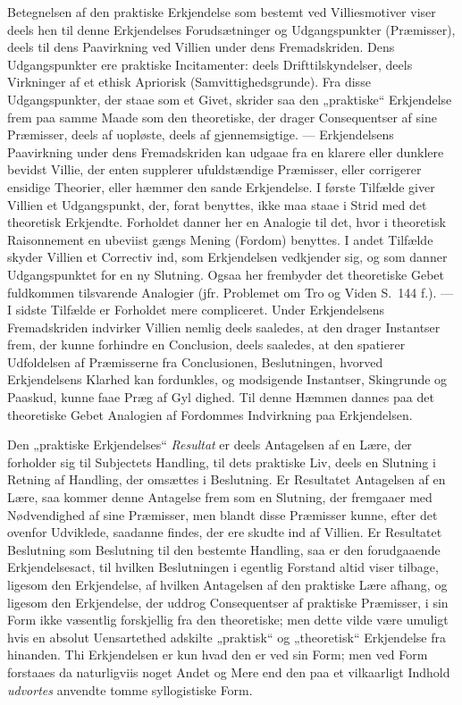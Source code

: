 Betegnelsen af den praktiske Erkjendelse som bestemt ved Villiesmotiver viser
deels hen til denne Erkjendelses Forudsætninger og Udgangspunkter
(Præmisser), deels til dens Paavirkning ved Villien under dens Fremadskriden.
Dens Udgangspunkter ere praktiske Incitamenter: deels Drifttilskyndelser,
deels Virkninger af et ethisk Apriorisk (Samvittighedsgrunde). Fra disse
Udgangspunkter, der staae som et Givet, skrider saa den „praktiske“
Erkjendelse frem paa samme Maade som den theoretiske, der drager Consequentser
af sine Præmisser, deels af uopløste, deels af gjennemsigtige. ---
Erkjendelsens Paavirkning under dens Fremadskriden kan udgaae fra en klarere
eller dunklere bevidst Villie, der enten supplerer ufuldstændige Præmisser,
eller corrigerer ensidige Theorier, eller hæmmer den sande Erkjendelse. I
første Tilfælde giver Villien et Udgangspunkt, der, forat benyttes, ikke maa
staae i Strid med det theoretisk Erkjendte. Forholdet danner her en Analogie
til det, hvor i theoretisk Raisonnement en ubeviist gængs Mening (Fordom)
benyttes. I andet Tilfælde skyder Villien et Correctiv ind, som Erkjendelsen
vedkjender sig, og som danner Udgangspunktet for en ny Slutning. Ogsaa her
frembyder det theoretiske Gebet fuldkommen tilsvarende Analogier (jfr.
Problemet om Tro og Viden S.\ 144 f.). --- I sidste Tilfælde er Forholdet mere
compliceret. Under Erkjendelsens Fremadskriden indvirker Villien nemlig deels
saaledes, at den drager Instantser frem, der kunne forhindre en Conclusion,
deels saaledes, at den spatierer Udfoldelsen af Præmisserne fra Conclusionen,
Beslutningen, hvorved Erkjendelsens Klarhed kan fordunkles, og modsigende
Instantser, Skingrunde og Paaskud, kunne faae Præg af Gyl\-%
dighed. Til denne Hæmmen dannes paa det theoretiske Gebet Analogien af
Fordommes Indvirkning paa Erkjendelsen.

Den „praktiske Erkjendelses“ \emph{Resultat} er deels Antagelsen af en Lære,
der forholder sig til Subjectets Handling, til dets praktiske Liv, deels en
Slutning i Retning af Handling, der omsættes i Beslutning. Er Resultatet
Antagelsen af en Lære, saa kommer denne Antagelse frem som en Slutning, der
fremgaaer med Nødvendighed af sine Præmisser, men blandt disse Præmisser
kunne, efter det ovenfor Udviklede, saadanne findes, der ere skudte ind af
Villien. Er Resultatet Beslutning som Beslutning til den bestemte Handling,
saa er den forudgaaende Erkjendelsesact, til hvilken Beslutningen i egentlig
Forstand altid viser tilbage, ligesom den Erkjendelse, af hvilken Antagelsen
af den praktiske Lære afhang, og ligesom den Erkjendelse, der uddrog
Consequentser af praktiske Præmisser, i sin Form ikke væsentlig forskjellig
fra den theoretiske; men dette vilde være umuligt hvis en absolut
Uensartethed adskilte „praktisk“ og „theoretisk“ Erkjendelse fra hinanden. Thi
Erkjendelsen er kun hvad den er ved sin Form; men ved Form forstaaes da
naturligviis noget Andet og Mere end den paa et vilkaarligt Indhold
\emph{udvortes} anvendte tomme syllogistiske Form.

